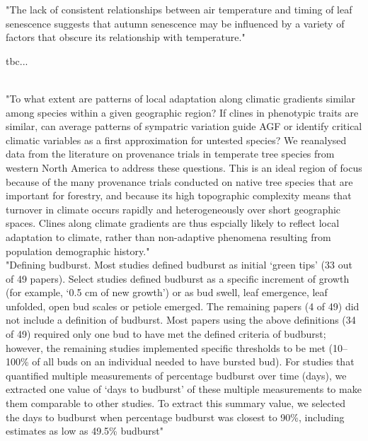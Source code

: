 \documentclass{article}
\begin{document}
"The lack of consistent relationships between air temperature and timing of leaf senescence suggests that autumn senescence may be influenced by a variety of factors that obscure its relationship with temperature."



tbc...

 
 

\citep{AitkenBemmels16}\\
"To what extent are patterns of local adaptation along climatic gradients similar among species within a given geographic region? If clines in phenotypic traits are similar, can average patterns of sympatric variation guide AGF or identify critical climatic variables as a first approximation for untested species? We reanalysed data from the literature on provenance trials in temperate tree species from western North America to address these questions. This is an ideal region of focus because of the many provenance trials conducted on native tree species that are important for forestry, and because its high topographic complexity means that turnover in climate occurs rapidly and heterogeneously over short geographic spaces. Clines along climate gradients are thus espcially likely to reflect local adaptation to climate, rather than non-adaptive phenomena resulting from population demographic history."
\\


"Defining budburst. Most studies defined budburst as initial ‘green tips’ (33 out of
49 papers). Select studies defined budburst as a specific increment of growth (for
example, ‘0.5 cm of new growth’) or as bud swell, leaf emergence, leaf unfolded,
open bud scales or petiole emerged. The remaining papers (4 of 49) did not
include a definition of budburst. Most papers using the above definitions (34 of 49)
required only one bud to have met the defined criteria of budburst; however, the
remaining studies implemented specific thresholds to be met (10–100\% of all buds
on an individual needed to have bursted bud). For studies that quantified multiple
measurements of percentage budburst over time (days), we extracted one value of
‘days to budburst’ of these multiple measurements to make them comparable to
other studies. To extract this summary value, we selected the days to budburst when
percentage budburst was closest to 90\%, including estimates as low as 49.5\% budburst"
\end{document}
